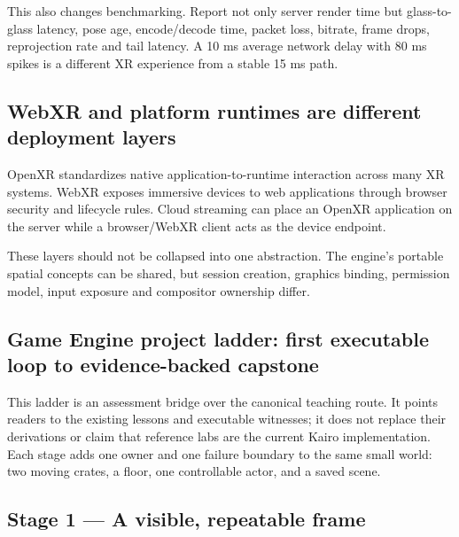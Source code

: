 This also changes benchmarking. Report not only server render time but glass-to-glass latency, pose age, encode/decode time, packet loss, bitrate, frame drops, reprojection rate and tail latency. A 10 ms average network delay with 80 ms spikes is a different XR experience from a stable 15 ms path.

\subsection{WebXR and platform runtimes are different deployment layers}\label{06-engine-ii-ch042-webxr-and-platform-runtimes-are-different-deployment-layers}

\hypertarget{06-engine-ii-ch042-webxr-and-platform-runtimes-are-different-deployment-layers}{}

OpenXR standardizes native application-to-runtime interaction across many XR systems. WebXR exposes immersive devices to web applications through browser security and lifecycle rules. Cloud streaming can place an OpenXR application on the server while a browser/WebXR client acts as the device endpoint.

These layers should not be collapsed into one abstraction. The engine's portable spatial concepts can be shared, but session creation, graphics binding, permission model, input exposure and compositor ownership differ.

\subsection{Game Engine project ladder: first executable loop to evidence-backed capstone}\label{06-engine-ii-ch042-game-engine-project-ladder-first-executable-loop-to-evidence-backed-capstone}

\hypertarget{06-engine-ii-ch042-game-engine-project-ladder-first-executable-loop-to-evidence-backed-capstone}{}

This ladder is an assessment bridge over the canonical teaching route. It points readers to the existing lessons and executable witnesses; it does not replace their derivations or claim that reference labs are the current Kairo implementation. Each stage adds one owner and one failure boundary to the same small world: two moving crates, a floor, one controllable actor, and a saved scene.

\subsection{Stage 1 --- A visible, repeatable frame}\label{06-engine-ii-ch042-stage-1-a-visible-repeatable-frame}

